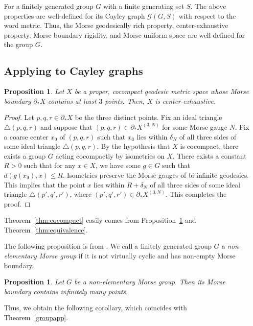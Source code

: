 \documentclass[a4paper,11pt,oneside]{article}
\newtheorem{Proposition}[Theorem]{Proposition}
\begin{document}
 
 For a finitely generated group $G$ with a finite generating set $S$. The above properties are well-defined for its Cayley graph $\mathcal{G}(G, S)$ with respect to the word metric. Thus, the Morse geodesically rich property, center-exhaustive property, Morse boundary rigidity, and Morse uniform space are well-defined for the group $G$.
 
\subsection*{Applying to Cayley graphs}

\begin{Proposition}\label{cocomp}
    Let $X$ be a proper, cocompact geodesic metric space whose Morse boundary $\partial_*X$ contains at least $3$ points. Then, $X$ is center-exhaustive.
\end{Proposition}
\begin{proof}
    Let $p, q, r\in \partial_*X$ be the three distinct points. Fix an ideal triangle $\triangle(p, q, r)$ and suppose that $(p, q, r)\in \partial_*X^{(3, N)}$ for some Morse gauge $N$. Fix a coarse center $x_0$ of $(p, q, r)$ such that $x_0$ lies within $\delta_N$ of all three sides of some ideal triangle $\triangle(p, q, r)$.
    By the hypothesis that $X$ is cocompact, there exists a group $G$ acting cocompactly by isometries on $X$. 
    There exists a constant $R>0$ such that for any $x\in X$, we have some $g\in G$ such that $d(g(x_0), x)\le R$.
    Isometries preserve the Morse gauges of bi-infinite geodesics. This implies that the point $x$ lies within $R+\delta_N$ of all three sides of some ideal triangle
    $\triangle(p', q', r')$, where $(p', q', r')\in \partial_*X^{(3, N)}$. This completes the proof.
    
    
\end{proof}

Theorem~\ref{thm:cocompact} easily comes from Proposition~\ref{cocomp} and Theorem~\ref{thm:equivalence}.

The following proposition is from \cite{Liu21}. We call a finitely generated group $G$ a \textit{non-elementary Morse group} if it is not virtually cyclic and has non-empty Morse boundary.
\begin{Proposition}
    Let $G$ be a non-elementary Morse group. Then its Morse boundary contains infinitely many points.
\end{Proposition}

Thus, we obtain the following corollary, which coincides with Theorem~\ref{groupapp}.
\end{document}
